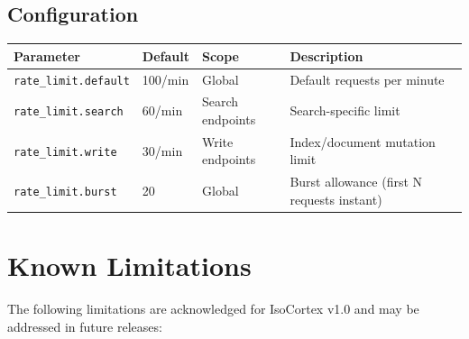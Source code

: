 \documentclass[11pt,a4paper]{article}
\newcommand{\inlinecode}[1]{\texttt{\small\colorbox{ctCodeBg}{#1}}}
\begin{document}
\subsection{Configuration}

\begin{center}
\begin{tabular}{@{}llll@{}}
\toprule
\textbf{Parameter} & \textbf{Default} & \textbf{Scope} & \textbf{Description} \\
\midrule
\inlinecode{rate\_limit.default} & 100/min & Global & Default requests per minute \\
\inlinecode{rate\_limit.search} & 60/min & Search endpoints & Search-specific limit \\
\inlinecode{rate\_limit.write} & 30/min & Write endpoints & Index/document mutation limit \\
\inlinecode{rate\_limit.burst} & 20 & Global & Burst allowance (first N requests instant) \\
\bottomrule
\end{tabular}
\end{center}

\section{Known Limitations}

The following limitations are acknowledged for IsoCortex v1.0 and may be addressed in future releases:
\end{document}
